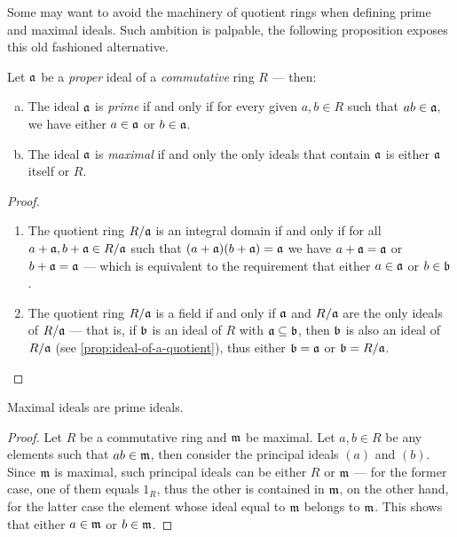 Some may want to avoid the machinery of quotient rings when defining prime and
maximal ideals. Such ambition is palpable, the following proposition exposes
this old fashioned alternative.

\begin{proposition}
\label{prop:equivalent-prime-maximal-ideals}
Let \(\mathfrak{a}\) be a \emph{proper} ideal of a \emph{commutative} ring
\(R\) --- then:
\begin{enumerate}[(a)]\setlength\itemsep{0em}
\item The ideal \(\mathfrak{a}\) is \emph{prime} if and only if for every given
  \(a, b \in R\) such that \(a b \in \mathfrak{a}\), we have either \(a \in
  \mathfrak{a}\) or \(b \in \mathfrak{a}\).

\item The ideal \(\mathfrak{a}\) is \emph{maximal} if and only the only ideals
  that contain \(\mathfrak{a}\) is either \(\mathfrak{a}\) itself or \(R\).
\end{enumerate}
\end{proposition}

\begin{proof}
\begin{enumerate}\setlength\itemsep{0em}
\item The quotient ring \(R/\mathfrak{a}\) is an integral domain if and only if for
  all \(a + \mathfrak{a}, b + \mathfrak{a} \in R/\mathfrak{a}\) such that
  \((a + \mathfrak{a})(b + \mathfrak{a}) = \mathfrak{a}\) we have
  \(a + \mathfrak{a} = \mathfrak{a}\) or \(b + \mathfrak{a} = \mathfrak{a}\) --- which is
  equivalent to the requirement that either \(a \in \mathfrak{a}\) or
  \(b \in \mathfrak{b}\).

\item The quotient ring \(R/\mathfrak{a}\) is a field if and only if \(\mathfrak{a}\)
  and \(R/\mathfrak{a}\) are the only ideals of \(R/\mathfrak{a}\) --- that is, if
  \(\mathfrak{b}\) is an ideal of \(R\) with \(\mathfrak{a} \subseteq \mathfrak{b}\),
  then \(\mathfrak{b}\) is also an ideal of \(R/\mathfrak{a}\) (see
  \cref{prop:ideal-of-a-quotient}), thus either \(\mathfrak{b} = \mathfrak{a}\) or
  \(\mathfrak{b} = R/\mathfrak{a}\).
\end{enumerate}
\end{proof}

\begin{corollary}
\label{cor:maximal-implies-prime}
Maximal ideals are prime ideals.
\end{corollary}

\begin{proof}
Let \(R\) be a commutative ring and \(\mathfrak{m}\) be maximal. Let \(a, b \in R\)
be any elements such that \(a b \in \mathfrak{m}\), then consider the principal
ideals \((a)\) and \((b)\). Since \(\mathfrak{m}\) is maximal, such principal
ideals can be either \(R\) or \(\mathfrak{m}\) --- for the former case, one of them
equals \(1_R\), thus the other is contained in \(\mathfrak{m}\), on the other hand,
for the latter case the element whose ideal equal to \(\mathfrak{m}\) belongs to
\(\mathfrak{m}\). This shows that either \(a \in \mathfrak{m}\) or
\(b \in \mathfrak{m}\).
\end{proof}


